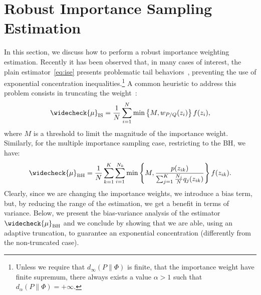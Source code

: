 \documentclass{article}
\begin{document}
\section{Robust Importance Sampling Estimation}\label{sec:robust}
In this section, we discuss how to perform a robust importance weighting estimation. Recently it has been observed that, in many cases of interest, the plain estimator~\eqref{eq:ise} presents problematic tail behaviors~\cite{metelli2018policy}, preventing the use of exponential concentration inequalities.\footnote{Unless we require that $d_{\infty}(P \| \Phi)$ is finite, \ie that the importance weight have finite supremum, there always exists a value $\alpha>1$ such that $d_{\alpha}(P \| \Phi)=+\infty$.} A common heuristic to address this problem consists in truncating the weight~\cite{ionides2008truncated}:
\begin{align}\label{eq:truncatedise}
	\widecheck{\mu}_{\text{IS}} = \frac{1}{N}\sum_{i=1}^{N} \min \left\{ M, {w}_{P/Q}(z_i) \right\} f(z_i),
\end{align}
where 
$M$ is a threshold to limit the magnitude of the importance weight. Similarly, for the multiple importance sampling case, restricting to the BH, we have:
\begin{align}\label{eq:truncatedmise}
	\widecheck{\mu}_{\text{BH}} =\frac{1}{N} \sum_{k=1}^K\sum_{i=1}^{N_k} \min \left\{M,  \frac{p(z_{ik})}{\sum_{j=1}^K \frac{N_j}{N} q_j(z_{ik})} \right\} f(z_{ik}).
\end{align}
Clearly, since we are changing the importance weights, we introduce a bias term, but, by reducing the range of the estimation, we get a benefit in terms of variance. Below, we present the bias-variance analysis of the estimator $\widecheck{\mu}_{\text{BH}}$ and we conclude by showing that we are able, using an adaptive truncation, to guarantee an exponential concentration (differently from the non-truncated case).
\end{document}
